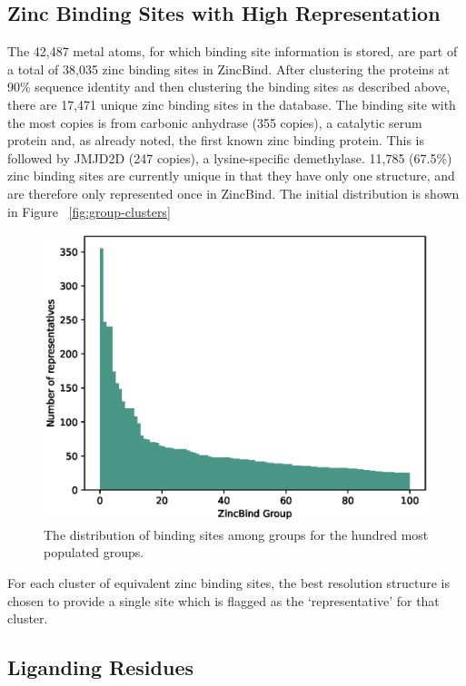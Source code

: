 \subsection{Zinc Binding Sites with High Representation}

The 42,487 metal atoms, for which binding site information is stored, are part of a total of 38,035 zinc binding sites in ZincBind. After clustering the proteins at 90\% sequence identity and then clustering the binding sites as described above, there are 17,471 unique zinc binding sites in the database. The binding site with the most copies is from carbonic anhydrase (355 copies), a catalytic serum protein and, as already noted, the first known zinc binding protein. This is followed by JMJD2D (247 copies), a lysine-specific demethylase. 11,785 (67.5\%) zinc binding sites are currently unique in that they have only one structure, and are therefore only represented once in ZincBind. The initial distribution is shown in Figure ~\ref{fig:group-clusters}

\begin{figure}
\centering
\includegraphics[width=1.0\textwidth]{Figures/group-clusters.eps}
\caption{\label{fig:group-clusters.eps} The distribution of binding sites among groups for the hundred most populated groups.}
\end{figure}

For each cluster of equivalent zinc binding sites, the best resolution structure is chosen to provide a single site which is flagged as the `representative' for that cluster.

\subsection{Liganding Residues}

